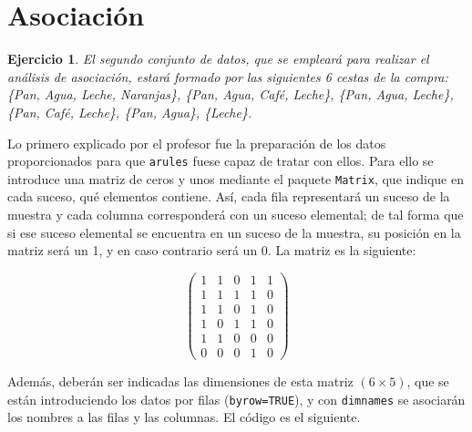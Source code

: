 \documentclass[12pt]{report}\usepackage[]{graphicx}\usepackage[dvipsnames]{xcolor}
\newtheorem{exercise}{Ejercicio}[section]
\begin{document}
		\section{Asociación}
		
			\begin{exercise}
				El segundo conjunto de datos, que se empleará para realizar el análisis de asociación, estará formado por las siguientes 6 cestas de la compra: \{Pan, Agua, Leche, Naranjas\}, \{Pan, Agua, Café, Leche\}, \{Pan, Agua, Leche\}, \{Pan, Café, Leche\}, \{Pan, Agua\}, \{Leche\}.
			\end{exercise}
				
			Lo primero explicado por el profesor fue la preparación de los datos proporcionados para que \texttt{arules} fuese capaz de tratar con ellos. Para ello se introduce una matriz de ceros y unos mediante el paquete \texttt{Matrix}, que indique en cada suceso, qué elementos contiene. Así, cada fila representará un suceso de la muestra y cada columna corresponderá con un suceso elemental; de tal forma que si ese suceso elemental se encuentra en un suceso de la muestra, su posición en la matriz será un 1, y en caso contrario será un 0. La matriz es la siguiente:
			
			$$
			\begin{pmatrix}
				1 & 1 & 0 & 1 & 1\\
				1 & 1 & 1 & 1 & 0\\
				1 & 1 & 0 & 1 & 0\\
				1 & 0 & 1 & 1 & 0\\
				1 & 1 & 0 & 0 & 0\\
				0 & 0 & 0 & 1 & 0
			\end{pmatrix}
			$$
			
			Además, deberán ser indicadas las dimensiones de esta matriz $(6\times5)$, que se están introduciendo los datos por filas (\texttt{byrow=TRUE}), y con \texttt{dimnames} se asociarán los nombres a las filas y las columnas. El código es el siguiente.
			
\end{document}
